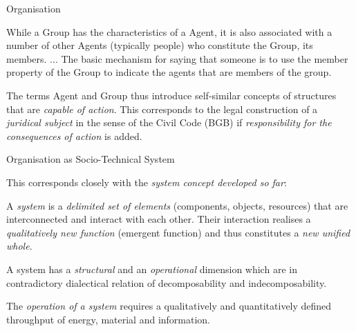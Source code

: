 \documentclass{beamer}
\begin{document}
\begin{frame}{Organisation}

  While a Group has the characteristics of a Agent, it is also associated with
  a number of other Agents (typically people) who constitute the Group, its
  members. ...  The basic mechanism for saying that someone is to use the
  member property of the Group to indicate the agents that are members of the
  group.
  
  The terms Agent and Group thus introduce self-similar concepts of structures
  that are \emph{capable of action}. This corresponds to the legal
  construction of a \emph{juridical subject} in the sense of the Civil Code
  (BGB) if \emph{responsibility for the consequences of action} is added.

\end{frame}

\begin{frame}{Organisation as Socio-Technical System}

This corresponds closely with the \emph{system concept developed so far}:

  A \emph{system} is a \emph{delimited set of elements} (components, objects,
  resources) that are interconnected and interact with each other. Their
  interaction realises a \emph{qualitatively new function} (emergent function)
  and thus constitutes a \emph{new unified whole}.

  A system has a \emph{structural} and an \emph{operational} dimension which
  are in contradictory dialectical relation of decomposability and
  indecomposability.

  The \emph{operation of a system} requires a qualitatively and quantitatively
  defined throughput of energy, material and information.
  
\end{frame}

\end{document}
